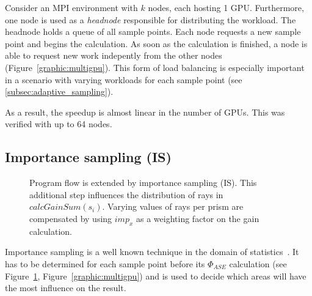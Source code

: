 Consider an MPI\cite{MPI} environment with $k$ nodes, each hosting 1 GPU\@. Furthermore, one
node is used as a \emph{headnode} responsible for distributing the workload. The
headnode holds a queue of all sample points. Each node requests a new sample
point and begins the calculation. As soon as the calculation is finished, a node
is able to request new work indepently from the other nodes (Figure~\ref{graphic:multigpu}). This form of load balancing is especially important in a
scenario with varying workloads for each sample point (see
\cref{subsec:adaptive_sampling}).

As a result, the speedup is almost linear in the number of GPUs. This was
verified with up to 64 nodes.
    
\subsection{Importance sampling (IS)}
\label{subsec:importance_sampling}
\begin{figure}[H]
  \centerline
  {}
  \caption{Program flow is extended by importance sampling (IS). This
    additional step influences the distribution of rays in
    $calcGainSum(s_i)$. Varying values of rays per prism are compensated by
    using $imp_x$ as a weighting factor on the gain calculation.}
  \label{graphic:pap2}
\end{figure}
Importance sampling is a well known technique in the domain
of statistics~\cite{importanceSamplingSource}. It has to be determined for each
sample point before its $\Phi_{ASE}$ calculation (see Figure~\ref{graphic:pap2},
Figure~\ref{graphic:multigpu}) and is used 
to decide which areas will have the most influence on the result.

